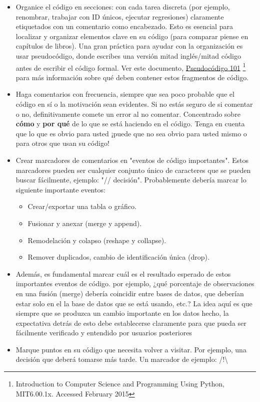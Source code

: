 \documentclass[11pt,en]{elegantpaper}
\begin{document}
\begin{itemize}
	\item Organice el código en secciones: con cada tarea discreta (por ejemplo, renombrar, trabajar con ID únicos, ejecutar regresiones) claramente etiquetados con un comentario como encabezado. Esto es esencial para localizar y organizar elementos clave en su código (para comparar piense en capítulos de libros). Una gran práctica para ayudar con la organización es usar pseudocódigo, donde escribes una versión mitad inglés/mitad código antes de escribir el código formal. Ver este documento, \href{http://courses.edx.org/c4x/MITx/6.00.1x/asset/files_ps04_files_WhyPseudocode.pdf}{Pseudocódigo 101} \footnote{Introduction to Computer Science and Programming Using Python, MIT6.00.1x. Accessed February 2015} para más información sobre qué deben contener estos fragmentos de código.
	
	\item Haga comentarios con frecuencia, siempre que sea poco probable que el código en sí o la motivación sean evidentes. Si no estás seguro de si comentar o no, definitivamente comete un error al no comentar. Concentrado sobre \textbf{cómo} y  \textbf{por qué} de lo que se está haciendo en el código. Tenga en cuenta que lo que es obvio para usted ¡puede que no sea obvio para usted mismo o para otros que usan su código!
	
	\item Crear marcadores de comentarios en "eventos de código importantes". Estos marcadores pueden ser cualquier conjunto único  de caracteres que se pueden buscar fácilmente, ejemplo: "// decisión". Probablemente debería marcar lo siguiente importante eventos:
	
		\begin{itemize}
			\item Crear/exportar una tabla o gráfico.
			\item Fusionar y anexar (merge y append).
			\item Remodelación y colapso (reshape y collapse).
			\item Remover duplicados, cambio de identificación única (drop).
		\end{itemize}
	
	\item Además, es fundamental marcar cuál es el resultado esperado de estos importantes eventos de código. por ejemplo, ¿qué porcentaje de observaciones en una fusión (merge) debería coincidir entre bases de datos, que deberían estar solo en el la base de datos que se está usando, etc.? La idea aquí es que siempre que se produzca un cambio importante en los datos hecho, la  expectativa detrás de esto debe establecerse claramente para que pueda ser fácilmente verificado y entendido por usuarios posteriores
	
	\item Marque puntos en su código que necesita volver a visitar. Por ejemplo, una decisión que deberá tomarse más tarde. Un  marcador de ejemplo: /!\textbackslash
\end{itemize}
\end{document}
